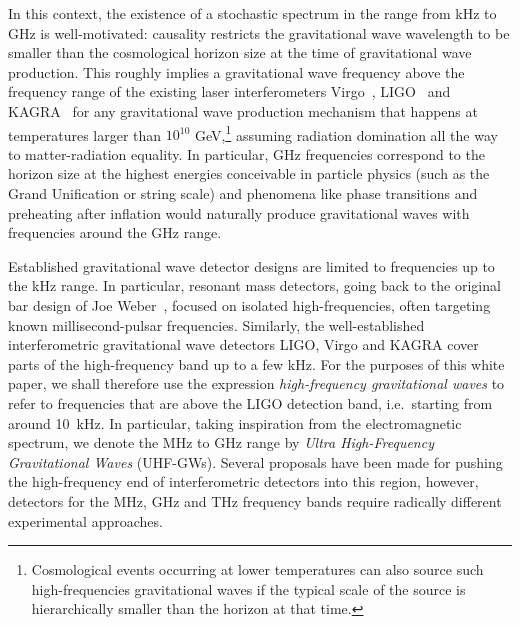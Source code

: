 \documentclass[11pt,a4paper]{article}
\begin{document}
In this context, the existence of a stochastic spectrum in the range from kHz to GHz is well-motivated: causality restricts the gravitational wave wavelength to be smaller than the cosmological horizon size at the time of gravitational wave production. This roughly implies a gravitational wave frequency above the frequency range of the existing laser interferometers Virgo~\cite{AdvVirgo,PhysRevLett.123.231108}, LIGO~\cite{aLIGO2015,PhysRevLett.116.131103,PhysRevD.102.062003,PhysRevLett.123.231107} and KAGRA~\cite{Akutsu:2018axf,PhysRevD.88.043007} for any gravitational wave production mechanism that happens at temperatures larger than $10^{10}$ GeV,\footnote{Cosmological events occurring at lower temperatures can also source such high-frequencies gravitational waves if the typical scale of the source is hierarchically smaller than the horizon at that time.}
assuming radiation domination all the way to matter-radiation equality. In particular, GHz frequencies correspond to the horizon size at the highest energies conceivable in particle physics (such as the Grand Unification or string scale) and phenomena like phase transitions and preheating after inflation would naturally produce gravitational waves with frequencies around the GHz range.

Established gravitational wave detector designs are limited to frequencies up to the kHz range. In particular, resonant mass detectors, going back to the original bar design of Joe Weber~\cite{Weber1967}, focused on isolated high-frequencies, often targeting known millisecond-pulsar frequencies. Similarly, the well-established interferometric gravitational wave detectors LIGO, Virgo and KAGRA cover parts of the high-frequency band up to a few kHz. For the purposes of this white paper, we shall therefore use the expression \emph{high-frequency gravitational waves} to refer to frequencies that are above the LIGO detection band, i.e.\ starting from around {10}~{kHz}. In particular, taking inspiration from the electromagnetic spectrum, we denote the MHz to GHz range by \textit{Ultra High-Frequency Gravitational Waves} (UHF-GWs). Several proposals have been made for pushing the high-frequency end of interferometric detectors into this region, however, detectors for the MHz, GHz and THz frequency bands require radically different experimental approaches.
\end{document}
